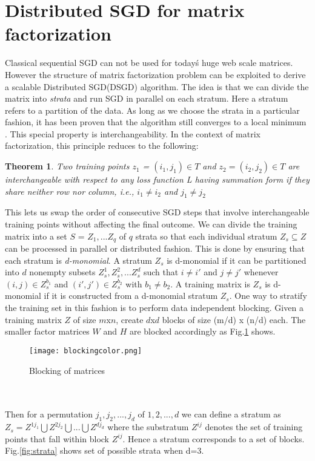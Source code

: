 \documentclass[a4paper,11pt]{article}
\newtheorem{theorem}{Theorem}
\begin{document}
\section{Distributed SGD for matrix factorization}
Classical sequential SGD can not be used for today\'s huge web scale matrices. However the structure of matrix factorization problem can be exploited to derive a scalable Distributed SGD(DSGD) algorithm. The idea is that we can divide the matrix into \textit{strata} and run SGD in parallel on each stratum. Here a stratum refers to a partition of the data. As long as we choose the strata in a particular fashion, it has been proven that the algorithm still converges to a local minimum \cite{dsgd}. This special property is interchangeability. In the context of matrix factorization, this principle reduces to the following:
\begin{theorem}
Two training points $z_1$ = $(i_1, j_1) \in T$ and $z_2 = (i_2, j_2) \in T$ are interchangeable with respect to any loss function L having summation form if they share neither row nor column, i.e., $i_1 \neq i_2$ and $j_1 \neq j_2$
\end{theorem}
This lets us swap the order of consecutive SGD steps that involve interchangeable training points without affecting the final outcome. We can divide the training matrix into a set $S$ = ${Z_1, ... Z_q}$ of $q$ strata so that each individual stratum $Z_s \subseteq Z $ can be processed in parallel or distributed fashion. This is done by ensuring that each stratum is \textit{d-monomial}. A stratum $Z_s$ is d-monomial if it can be partitioned into $d$ nonempty subsets $Z_s^1,Z_s^2, ...Z_s^d$ such that $i \neq i'$ and $j\neq j'$ whenever $(i,j) \in Z_s^{b_1}$ and $(i',j') \in Z_s^{b_2}$ with $b_1 \neq b_2$. A training matrix is $Z_s$ is d-monomial if it is constructed from a d-monomial stratum $Z_s$.  One way to stratify the training set in this fashion is to perform data independent blocking.  Given a training matrix $Z$ of size $m$x$n$, create $d$x$d$ blocks of size (m/d) x (n/d) each. The smaller factor matrices $W$ and $H$ are blocked accordingly as Fig.\ref{fig:blockingcolor} shows.
\begin{figure}[h]
   \centering
    \texttt{[image: blockingcolor.png]}
    \caption{Blocking of matrices}
   \label{fig:blockingcolor}
\end{figure}
\\\\
Then for a permutation $j_1, j_2, ... , j_d$ of $1, 2, ...,d$ we can define a stratum as $Z_s = Z^{1j_1}\bigcup Z^{2j_2}\bigcup...\bigcup Z^{dj_d}$ where the substratum $Z^{ij}$ denotes the set of training points that fall within block $Z^{ij}$. Hence a stratum corresponds to a set of blocks. Fig.\ref{fig:strata} shows set of possible strata when d=3. 
\end{document}
